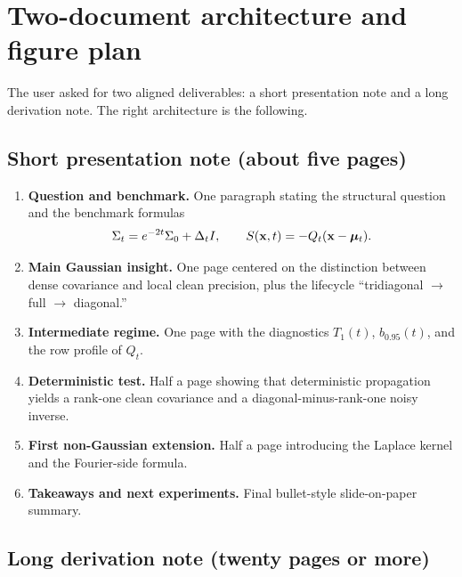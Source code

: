 \documentclass[11pt]{article}
\begin{document}
\section{Two-document architecture and figure plan}

The user asked for two aligned deliverables: a short presentation note and a long derivation note. The right architecture is the following.

\subsection{Short presentation note (about five pages)}

\begin{enumerate}[label=\textbf{S\arabic*.},leftmargin=1.2cm]
\item \textbf{Question and benchmark.} One paragraph stating the structural question and the benchmark formulas
\begin{equation*}
 \Sigma_t=e^{-2t}\Sigma_0+\Delta_tI,
 \qquad
 S(\mathbf x,t)=-Q_t(\mathbf x-\boldsymbol\mu_t).
\end{equation*}
\item \textbf{Main Gaussian insight.} One page centered on the distinction between dense covariance and local clean precision, plus the lifecycle ``tridiagonal $\to$ full $\to$ diagonal.''
\item \textbf{Intermediate regime.} One page with the diagnostics $T_1(t)$, $b_{0.95}(t)$, and the row profile of $Q_t$.
\item \textbf{Deterministic test.} Half a page showing that deterministic propagation yields a rank-one clean covariance and a diagonal-minus-rank-one noisy inverse.
\item \textbf{First non-Gaussian extension.} Half a page introducing the Laplace kernel and the Fourier-side formula.
\item \textbf{Takeaways and next experiments.} Final bullet-style slide-on-paper summary.
\end{enumerate}

\subsection{Long derivation note (twenty pages or more)}
\end{document}
